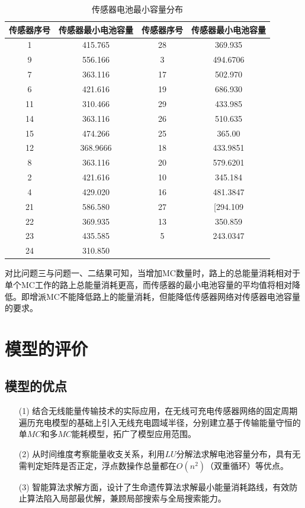 \documentclass{whutmod}
\begin{document}
  		\begin{table}[H]
  	\centering		
  	\caption{传感器电池最小容量分布}\label{adfs}
  	\begin{tabular}{cccc}
  		\toprule[2pt]
  		\multicolumn{1}{m{2.5cm}}{\centering 传感器序号}
  		& \multicolumn{1}{m{4.5cm}}{\centering 传感器最小电池容量}& \multicolumn{1}{m{2.5cm}}{\centering 传感器序号}& \multicolumn{1}{m{4.5cm}}{\centering 传感器最小电池容量}
  		\\
  		\midrule[1pt]
  		1 &   415.765 & 28&369.935\\ 
  		9&   556.166& 3&494.6706\\ 
  		7&   363.116& 17&502.970\\ 
  		6 &   421.616& 19&686.930\\ 
  		11 &   310.466 & 29&433.985\\ 
  		14&   363.116& 26&510.635\\ 
  		15 &  474.266& 25&365.00\\ 
  		12&  368.9666& 18&433.9851\\ 
  		8&  363.116& 20&579.6201\\ 
  		2 &  421.616& 10&345.184\\ 
  		4&  429.020& 16&481.3847\\ 
  		21&  586.580& 27&[294.109 \\ 
  		22 &  369.935& 13&350.859\\ 
  		23 & 435.585& 5&243.0347\\ 
  		24 & 310.850& &\\
  		\bottomrule[2pt]	
  	\end{tabular}
  \end{table}
  对比问题三与问题一、二结果可知，当增加MC数量时，路上的总能量消耗相对于单个MC工作的路上总能量消耗更高，而传感器的最小电池容量的平均值将相对降低。即增派MC不能降低路上的能量消耗，但能降低传感器网络对传感器电池容量的要求。
 
  	\section{模型的评价}
		\subsection{模型的优点}
			\begin{itemize}                                             
			\item [(1)]结合无线能量传输技术的实际应用，在无线可充电传感器网络的固定周期遍历充电模型的基础上引入无线充电圆域半径，分别建立基于传输能量守恒的单$MC$和多$MC$能耗模型，拓广了模型应用范围。
			\item [(2)]从时间维度考察能量收支关系，利用$LU$分解法求解电池容量分布，具有无需判定矩阵是否正定，浮点数操作总量都在$O(n^2)$（双重循环）等优点。 
			\item [(3)]智能算法求解方面，设计了生命遗传算法求解最小能量消耗路线，有效防止算法陷入局部最优解，兼顾局部搜索与全局搜索能力。
			\end{itemize}
\end{document}
